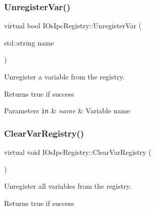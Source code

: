 \subsubsection{\texorpdfstring{Unregister\+Var()}{UnregisterVar()}}
{\footnotesize\ttfamily virtual bool I\+Os\+Ipc\+Registry\+::\+Unregister\+Var (\begin{DoxyParamCaption}\item[{std\+::string}]{name }\end{DoxyParamCaption})\hspace{0.3cm}{\ttfamily [pure virtual]}}



Unregister a variable from the registry. 

\begin{DoxyReturn}{Returns}
true if success 
\end{DoxyReturn}

\begin{DoxyParams}[1]{Parameters}
\mbox{\tt in}  & {\em name} & Variable name \\
\hline
\end{DoxyParams}
\mbox{\label{classIOsIpcRegistry_ac84f55f0f6f5469e6333270c17a8450c}} 
\subsubsection{\texorpdfstring{Clear\+Var\+Registry()}{ClearVarRegistry()}}
{\footnotesize\ttfamily virtual void I\+Os\+Ipc\+Registry\+::\+Clear\+Var\+Registry (\begin{DoxyParamCaption}{ }\end{DoxyParamCaption})\hspace{0.3cm}{\ttfamily [pure virtual]}}



Unregister all variables from the registry. 

\begin{DoxyReturn}{Returns}
true if success 
\end{DoxyReturn}
\mbox{\label{classIOsIpcRegistry_a9e912067bedaecd35cf5ca8dbea54f12}} 
